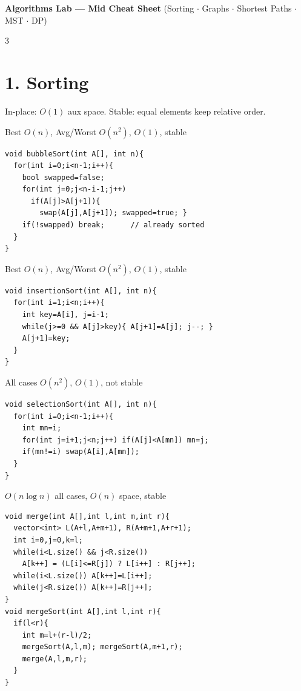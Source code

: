 \documentclass[8pt,landscape,a4paper]{extarticle}
\newcommand{\algo}[2]{\vspace{1pt}{\bfseries #1}\hfill{\footnotesize\color{cx}#2}\par\vspace{-1pt}}
\begin{document}
\begin{center}
{\Large\bfseries\color{hd}Algorithms Lab --- Mid Cheat Sheet}\quad
{\footnotesize (Sorting $\cdot$ Graphs $\cdot$ Shortest Paths $\cdot$ MST $\cdot$ DP)}
\end{center}
\vspace{-4pt}

\begin{multicols}{3}

\section*{1. Sorting}
{\footnotesize In-place: $O(1)$ aux space. Stable: equal elements keep relative order.}

\algo{Bubble Sort}{Best $O(n)$, Avg/Worst $O(n^2)$, $O(1)$, stable}
\begin{lstlisting}
void bubbleSort(int A[], int n){
  for(int i=0;i<n-1;i++){
    bool swapped=false;
    for(int j=0;j<n-i-1;j++)
      if(A[j]>A[j+1]){
        swap(A[j],A[j+1]); swapped=true; }
    if(!swapped) break;      // already sorted
  }
}
\end{lstlisting}

\algo{Insertion Sort}{Best $O(n)$, Avg/Worst $O(n^2)$, $O(1)$, stable}
\begin{lstlisting}
void insertionSort(int A[], int n){
  for(int i=1;i<n;i++){
    int key=A[i], j=i-1;
    while(j>=0 && A[j]>key){ A[j+1]=A[j]; j--; }
    A[j+1]=key;
  }
}
\end{lstlisting}

\algo{Selection Sort}{All cases $O(n^2)$, $O(1)$, not stable}
\begin{lstlisting}
void selectionSort(int A[], int n){
  for(int i=0;i<n-1;i++){
    int mn=i;
    for(int j=i+1;j<n;j++) if(A[j]<A[mn]) mn=j;
    if(mn!=i) swap(A[i],A[mn]);
  }
}
\end{lstlisting}

\algo{Merge Sort}{$O(n\log n)$ all cases, $O(n)$ space, stable}
\begin{lstlisting}
void merge(int A[],int l,int m,int r){
  vector<int> L(A+l,A+m+1), R(A+m+1,A+r+1);
  int i=0,j=0,k=l;
  while(i<L.size() && j<R.size())
    A[k++] = (L[i]<=R[j]) ? L[i++] : R[j++];
  while(i<L.size()) A[k++]=L[i++];
  while(j<R.size()) A[k++]=R[j++];
}
void mergeSort(int A[],int l,int r){
  if(l<r){
    int m=l+(r-l)/2;
    mergeSort(A,l,m); mergeSort(A,m+1,r);
    merge(A,l,m,r);
  }
}
\end{lstlisting}


\end{multicols}
\end{document}
